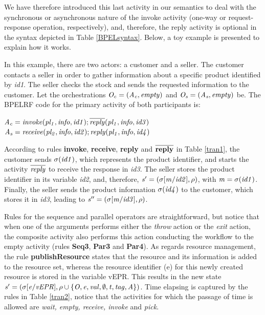 We have therefore introduced this last activity
in our semantics to deal with the synchronous or asynchronous nature of
the invoke activity (one-way or request-response operation, respectively), and, therefore, the
reply activity is optional in the syntax depicted in Table \ref{BPELsyntax}. Below, a toy example 
is presented to explain how it works.
\begin{example}\label{ex1} 
In this example, there are two actors: a customer and a
seller. The customer contacts a seller in order to gather information about a specific product identified by \emph{id1}. The seller checks the stock and sends the requested information to the customer. Let the orchestrations ${\it O_{c}= (A_{c},empty)}$ and ${\it O_{s}= (A_{s},empty)}$ be. The BPELRF code for the primary activity of both participants is:
\vspace{0.3cm}
\begin{flushleft}
\hspace{1cm}${\it A_{c}= invoke(pl_1,info,id1);\overline{reply}(pl_1,info,id3)}$\\
\hspace{1cm}${\it A_{s}= receive(pl_2,info,id2);reply(pl_1,info,id4)}$
\end{flushleft}
\end{example}

According to rules {\bf invoke}, {\bf receive}, {\bf reply} and {\bf $\overline{{\bf reply}}$} in Table \ref{tran1},  the customer sends ${\it \sigma(id1)}$, which represents the product identifier, and starts the activity ${\it \overline{reply}}$ to receive the response in {\it id3}. The seller stores the product identifier in its variable {\it id2}, and, therefore, ${\it s'=(\sigma[m/id2],\rho)}$, with ${\it m=\sigma(id1)}$. Finally, the seller sends the product information ${\it \sigma(id4)}$ to the customer, which stores it in {\it id3}, leading to ${\it s''=(\sigma[m/id3],\rho)}$.

Rules for the sequence and parallel operators are straightforward, but notice that when one of the
arguments performs either the \emph{throw} action or the \emph{exit} action, the composite
activity also performs this action conducting the workflow to the empty activity (rules {\bf Seq3}, {\bf Par3} and {\bf Par4}). As regards resource management, the rule {\bf publishResource} states that the resource and its information is added to the resource set, whereas the resource identifier (e) for this newly created resource is stored in the variable vEPR. This results in the new state $\it{s'=(\sigma[e/vEPR], \rho \cup \{O,e,val,\emptyset,t,tag,A\})}$. Time elapsing is captured by the rules in Table \ref{tran2}, notice that the activities for which the passage of time is allowed are {\em wait, empty, receive, invoke} and {\em pick}.

